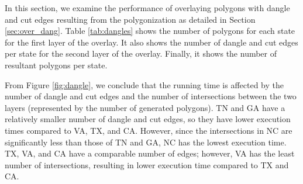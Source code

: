 In this section, we examine the performance of overlaying polygons with dangle and cut edges resulting from the polygonization as detailed in Section \ref{sec:over_dang}.  Table \ref{tab:dangles} shows the number of polygons for each state for the first layer of the overlay. It also shows the number of dangle and cut edges per state for the second layer of the overlay. Finally, it shows the number of resultant polygons per state.  

From Figure \ref{fig:dangle}, we conclude that the running time is affected by the number of dangle and cut edges and the number of intersections between the two layers (represented by the number of generated polygons).  TN and GA have a relatively smaller number of dangle and cut edges, so they have lower execution times compared to VA, TX, and CA. However, since the intersections in NC are significantly less than those of TN and GA, NC has the lowest execution time. TX, VA, and CA have a comparable number of edges; however, VA has the least number of intersections, resulting in lower execution time compared to TX and CA.
